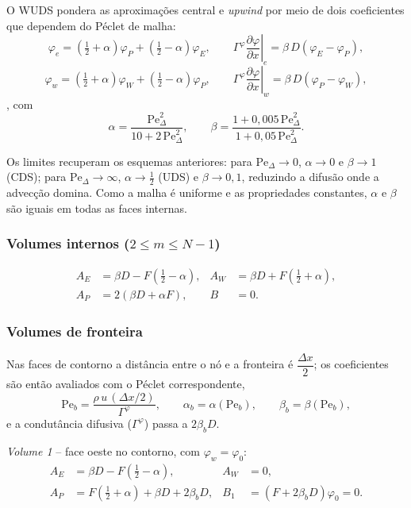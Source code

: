 O WUDS pondera as aproximações central e \emph{upwind} por meio de dois
coeficientes que dependem do Péclet de malha:
\[
  \varphi_e=\left(\tfrac12+\alpha\right)\varphi_P
           +\left(\tfrac12-\alpha\right)\varphi_E ,
  \qquad
  \left.\Gamma^{\varphi}\frac{\partial\varphi}{\partial x}\right|_e
  =\beta\,D\left(\varphi_E-\varphi_P\right),
\]
\[
  \varphi_w=\left(\tfrac12+\alpha\right)\varphi_W
           +\left(\tfrac12-\alpha\right)\varphi_P ,
  \qquad
  \left.\Gamma^{\varphi}\frac{\partial\varphi}{\partial x}\right|_w
  =\beta\,D\left(\varphi_P-\varphi_W\right),
\]
, com
\begin{equation}
  \alpha=\frac{\mathrm{Pe}_{\Delta}^{2}}{10+2\,\mathrm{Pe}_{\Delta}^{2}},
  \qquad
  \beta=\frac{1+0{,}005\,\mathrm{Pe}_{\Delta}^{2}}{1+0{,}05\,\mathrm{Pe}_{\Delta}^{2}} .
\end{equation}

Os limites recuperam os esquemas anteriores: para $\mathrm{Pe}_{\Delta}\to0$,
$\alpha\to0$ e $\beta\to1$ (CDS); para $\mathrm{Pe}_{\Delta}\to\infty$,
$\alpha\to\tfrac12$ (UDS) e $\beta\to0{,}1$, reduzindo a difusão onde a
advecção domina. Como a malha é uniforme e as propriedades constantes,
$\alpha$ e $\beta$ são iguais em todas as faces internas.

\subsubsection*{Volumes internos ($2\le m\le N-1$)}
\[
\begin{aligned}
  A_E&=\beta D-F\left(\tfrac12-\alpha\right), &
  A_W&=\beta D+F\left(\tfrac12+\alpha\right), \\[4pt]
  A_P&=2\left(\beta D+\alpha F\right), &
  B&=0 .
\end{aligned}
\]

\subsubsection*{Volumes de fronteira}

Nas faces de contorno a distância entre o nó e a fronteira é $\dfrac{\Delta x}{2}$;
os coeficientes são então avaliados com o Péclet correspondente,
\[
  \mathrm{Pe}_{b}=\frac{\rho\,u\,(\Delta x/2)}{\Gamma^{\varphi}},
  \qquad
  \alpha_b=\alpha(\mathrm{Pe}_b),\qquad \beta_b=\beta(\mathrm{Pe}_b),
\]
e a condutância difusiva ($ \Gamma^\varphi$) passa a $2\beta_b D$.

\emph{Volume 1} -- face oeste no contorno, com $\varphi_w=\varphi_0$:
\[
\begin{aligned}
  A_E&=\beta D-F\left(\tfrac12-\alpha\right), &
  A_W&=0, \\[4pt]
  A_P&=F\left(\tfrac12+\alpha\right)+\beta D+2\beta_b D, &
  B_1&=\left(F+2\beta_b D\right)\varphi_0=0 .
\end{aligned}
\]

